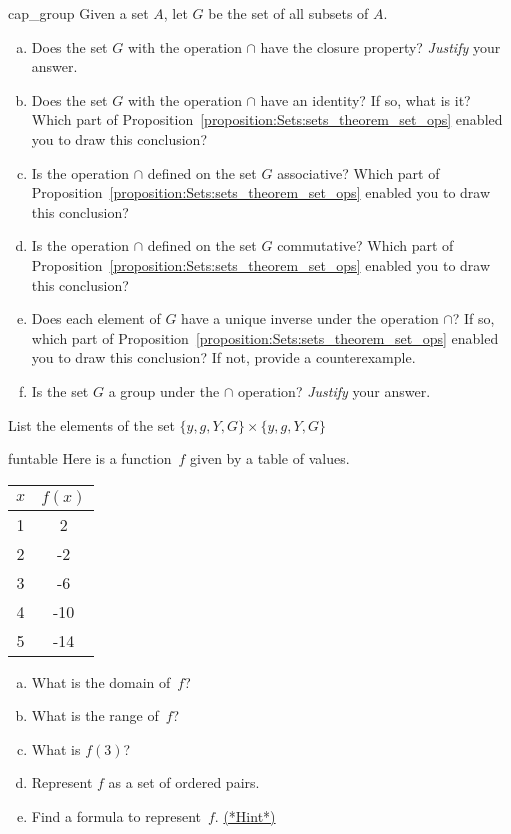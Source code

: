 \begin{exercise}{cap_group}
Given a set $A$, let $G$ be the set of all subsets of $A$. 
\begin{enumerate}[(a)]
\item
Does the set $G$  with the operation $\cap$ have the closure property? \emph{Justify} your answer.
\item
Does the set $G$  with the operation $\cap$ have an identity? If so, what is it? Which part of  Proposition~\ref{proposition:Sets:sets_theorem_set_ops} enabled you to draw this conclusion?
\item
Is the operation $\cap$ defined on the set $G$ associative? Which part of  Proposition~\ref{proposition:Sets:sets_theorem_set_ops} enabled you to draw this conclusion?
\item
Is the operation $\cap$ defined on the set $G$ commutative? Which part of  Proposition~\ref{proposition:Sets:sets_theorem_set_ops} enabled you to draw this conclusion?
\item
Does each element of $G$ have a unique inverse under the operation $\cap$? If so, which part of  Proposition~\ref{proposition:Sets:sets_theorem_set_ops} enabled you to draw this conclusion? If not, provide a counterexample.
\item
Is the set $G$ a group under the $\cap$ operation?  \emph{Justify} your answer.
\end{enumerate}
\end{exercise} 

\begin{exercise}{}
List the elements of the set
$\{y,g,Y,G\} \times \{y,g,Y,G\}$
\end{exercise}

\begin{exercise}{funtable}
Here is a function~$f$ given by a table of values.

\begin{center}
\begin{tabular}{c|c}
$x$ & $f(x)$ \\ \hline

1 & 2 \\
2 & -2 \\
3 & -6 \\
4 & -10 \\
5 & -14 \\
\end{tabular}
\end{center}

\begin{enumerate}[(a)]
\item  \label{FunctionByTableEx-domain}
What is the domain of~$f$?
\item \label{FunctionByTableEx-range}
What is the range of~$f$? 
\item  \label{FunctionByTableEx-f(3)}
What is $f(3)$?
\item  \label{FunctionByTableEx-pairs}
Represent $f$ as a set of ordered pairs.
\item  \label{FunctionByTableEx-formula}
Find a formula to represent~$f$.
\hyperref[sec:Functions:Hints]{(*Hint*)}
\end{enumerate}
\end{exercise}

